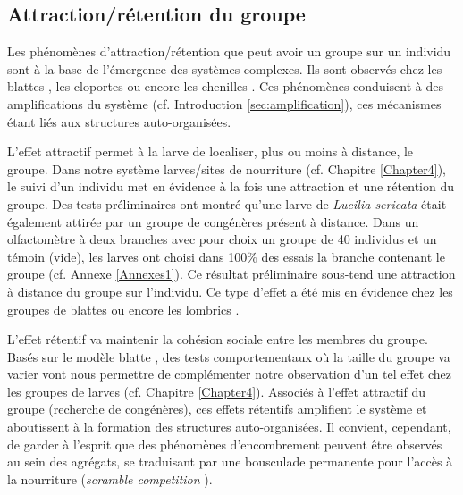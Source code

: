 		\subsection{Attraction/rétention du groupe}
Les phénomènes d'attraction/rétention que peut avoir un groupe sur un individu sont à la base de l'émergence des systèmes complexes. Ils sont observés chez les blattes \citep{canonge_individuel_2011,lihoreau_collective_2010}, les cloportes \cite{devigne_individual_2011} ou encore les chenilles \cite{fitzgerald_specificity_1979}. Ces phénomènes conduisent à des amplifications du système (cf. Introduction \ref{sec:amplification}), ces mécanismes étant liés aux structures auto-organisées. 

L'effet attractif permet à la larve de localiser, plus ou moins à distance, le groupe. Dans notre système larves/sites de nourriture (cf. Chapitre \ref{Chapter4}), le suivi d'un individu met en évidence à la fois une attraction et une rétention du groupe. Des tests préliminaires ont montré qu'une larve de \textit{Lucilia sericata} était également attirée par un groupe de congénères présent à distance. Dans un olfactomètre à deux branches avec pour choix un groupe de 40 individus et un témoin (vide), les larves ont choisi dans 100$\%$ des essais la branche contenant le groupe (cf. Annexe \ref{Annexes1}). Ce résultat préliminaire sous-tend une attraction à distance du groupe sur l'individu. Ce type d'effet a été mis en évidence chez les groupes de blattes \cite{ame_cockroach_2004} ou encore les lombrics \cite{zirbes_earthworms_2011}.

L'effet rétentif va maintenir la cohésion sociale entre les membres du groupe. Basés sur le modèle blatte \cite{canonge_individuel_2011}, des tests comportementaux où la taille du groupe va varier vont nous permettre de complémenter notre observation d'un tel effet chez les groupes de larves (cf. Chapitre \ref{Chapter4}). Associés à l'effet attractif du groupe (recherche de congénères), ces effets rétentifs amplifient le système et aboutissent à la formation des structures auto-organisées. Il convient, cependant, de garder à l'esprit que des phénomènes d'encombrement peuvent être observés au sein des agrégats, se traduisant par une bousculade permanente pour l'accès à la nourriture (\textit{scramble competition} \cite{rivers_physiological_2011}).

